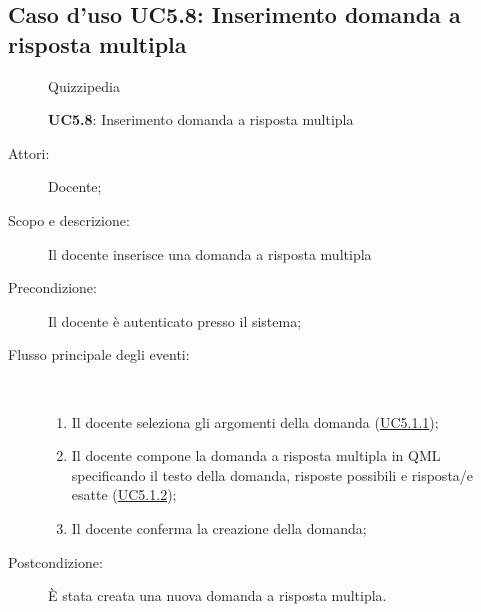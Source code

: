 \subsection{Caso d'uso UC5.8: Inserimento domanda a risposta multipla}
	\begin{figure}[H]
		\centering
		\begin{resizedtikzpicture}{\textwidth}
		\begin{umlsystem}[x=0, fill=lightgray!20]{Quizzipedia}
		\end{umlsystem}
		\end{resizedtikzpicture}
		\caption{\textbf{UC5.8}: Inserimento domanda a risposta multipla}
		\label{UC5.8}
	\end{figure}
\begin{description}
\item[Attori:] Docente;
\item[Scopo e descrizione:] Il docente inserisce una domanda a risposta multipla
      \item[Precondizione:] Il docente è autenticato presso il sistema;

        \item[Flusso principale degli eventi:] \ 
 \begin{enumerate}
          \item Il docente seleziona gli argomenti della domanda (\hyperlink{UC5.1.1}{UC5.1.1});
          \item Il docente compone la domanda a risposta multipla in QML specificando il testo della domanda, risposte possibili e risposta/e esatte (\hyperlink{UC5.1.2}{UC5.1.2});
          \item Il docente conferma la creazione della domanda;

      \end{enumerate}
    \item[Postcondizione:] È stata creata una nuova domanda a risposta multipla.
  \end{description}
\hypertarget{UC5.9}{}
